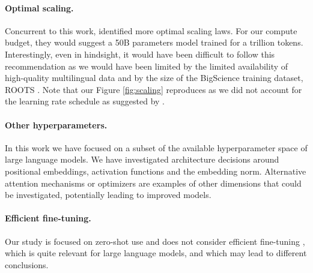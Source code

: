 \paragraph{Optimal scaling.} Concurrent to this work,  \citet{hoffmann2022training} identified more optimal scaling laws. For our compute budget, they would suggest a 50B parameters model trained for a trillion tokens. Interestingly, even in hindsight, it would have been difficult to follow this recommendation as we would have been limited by the limited availability of high-quality multilingual data and by the size of the BigScience training dataset, ROOTS \cite{roots}. Note that our Figure \ref{fig:scaling} reproduces \citet{kaplan2020scaling} as we did not account for the learning rate schedule as suggested by \citet{hoffmann2022training}.

\paragraph{Other hyperparameters.} 
In this work we have focused on a subset of the available hyperparameter space of large language models. We have investigated architecture decisions around positional embeddings, activation functions and the embedding norm. Alternative attention mechanisms \cite{tay2020long} or optimizers are examples of other dimensions that could be investigated, potentially leading to improved models.

\paragraph{Efficient fine-tuning.} 
Our study is focused on zero-shot use and does not consider efficient fine-tuning \cite{lester2021power, zaken2021bitfit}, which is quite relevant for large language models, and which may lead to different conclusions.